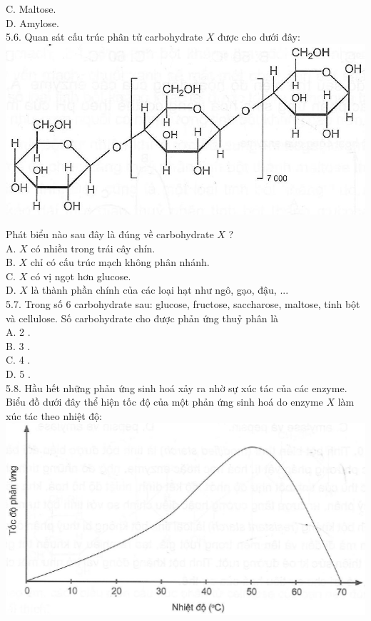 \documentclass[10pt]{article}
\begin{document}
C. Maltose.\\
D. Amylose.\\
5.6. Quan sát cấu trúc phân tử carbohydrate $X$ được cho dưới đây:\\
\includegraphics[max width=\textwidth, center]{2025_10_23_de6f5713836e4e91b3c8g-031}

Phát biểu nào sau đây là đúng về carbohydrate $X$ ?\\
A. $X$ có nhiều trong trái cây chín.\\
B. $X$ chỉ có cấu trúc mạch không phân nhánh.\\
C. $X$ có vị ngọt hơn glucose.\\
D. $X$ là thành phần chính của các loại hạt như ngô, gạo, đậu, ...\\
5.7. Trong số 6 carbohydrate sau: glucose, fructose, saccharose, maltose, tinh bột và cellulose. Số carbohydrate cho được phản ứng thuỷ phân là\\
A. 2 .\\
B. 3 .\\
C. 4 .\\
D. 5 .\\
5.8. Hầu hết những phản ứng sinh hoá xảy ra nhờ sự xúc tác của các enzyme. Biểu đồ dưới đây thể hiện tốc độ của một phản ứng sinh hoá do enzyme $X$ làm xúc tác theo nhiệt độ:\\
\includegraphics[max width=\textwidth, center]{2025_10_23_de6f5713836e4e91b3c8g-031(1)}
\end{document}

